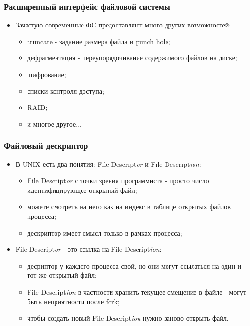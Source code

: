 \begin{frame}
\frametitle{Расширенный интерфейс файловой системы}
\begin{itemize}
  \item Зачастую современные ФС предоставляют много других возможностей:
    \begin{itemize}
      \item truncate - задание размера файла и punch hole;
      \item дефрагментация - переупорядочивание содержимого файлов на диске;
      \item шифрование;
      \item списки контроля доступа;
      \item RAID;
      \item и многое другое...
    \end{itemize}
\end{itemize}
\end{frame}

\begin{frame}
\frametitle{Файловый дескриптор}
\begin{itemize}
  \item<1-> В UNIX есть два понятия: File Descript\emph{or} и File Descript\emph{ion}:
    \begin{itemize}
      \item File Descript\emph{or} с точки зрения программиста - просто число идентифицирующее открытый файл;
      \item можете смотреть на него как на индекс в таблице открытых файлов процесса;
      \item дескриптор имеет смысл только в рамках процесса;
    \end{itemize}
  \item<2-> File Descript\emph{or} - это ссылка на File Descript\emph{ion}:
    \begin{itemize}
      \item десриптор у каждого процесса свой, но они могут ссылаться на один и тот же открытый файл;
      \item File Descript\emph{ion} в частности хранить текущее смещение в файле - могут быть неприятности после fork;
      \item чтобы создать новый File Descript\emph{ion} нужно заново открыть файл.
    \end{itemize}
\end{itemize}
\end{frame}

